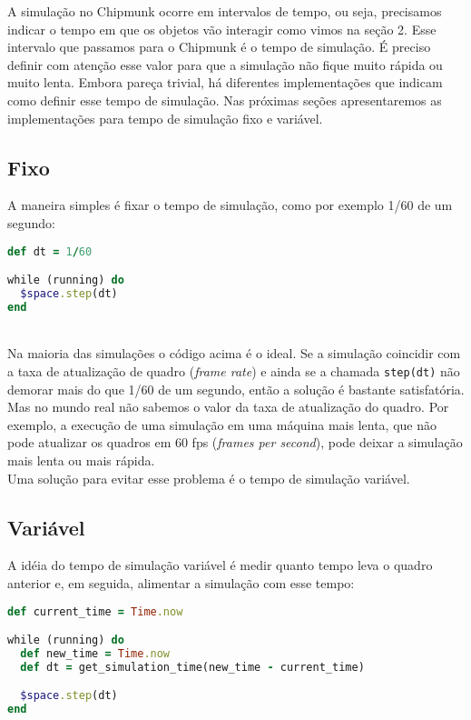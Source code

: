 A simulação no Chipmunk ocorre em intervalos de tempo, ou seja, precisamos indicar o tempo em que os objetos vão interagir como vimos na seção 2. 
Esse intervalo que passamos para o Chipmunk é o tempo de simulação. É preciso definir com atenção esse valor para que a simulação não fique muito rápida
ou muito lenta. Embora pareça trivial, há diferentes implementações que indicam como definir esse tempo de simulação. Nas 
próximas seções apresentaremos as implementações para tempo de simulação fixo e variável.

\subsection{Fixo}

A maneira simples é fixar o tempo de simulação, como por exemplo 1/60 de um segundo:

\begin{lstlisting}[language=Ruby, caption=Implementação de tempo de simulação fixo]
def dt = 1/60

while (running) do
  $space.step(dt)
end
\end{lstlisting}

\ \\
\hspace*{14pt} Na maioria das simulações o código acima é o ideal. Se a simulação coincidir com a taxa de atualização de quadro (\textit{frame rate}) e ainda se a chamada {\tt step(dt)} não demorar mais do que 1/60 de um segundo, então a solução é bastante satisfatória. Mas no mundo real não sabemos
o valor da taxa de atualização do quadro. Por exemplo, a execução de uma simulação em uma máquina mais lenta, que não pode atualizar os quadros em 60 fps (\textit{frames per second}),
pode deixar a simulação mais lenta ou mais rápida. \\

Uma solução para evitar esse problema é o tempo de simulação variável.

\subsection{Variável}

A idéia do tempo de simulação variável é medir quanto tempo leva o quadro anterior e, em seguida, alimentar a simulação com esse tempo: 

\newpage
\begin{lstlisting}[language=Ruby, caption=Implementação de tempo de simulação variável]
def current_time = Time.now

while (running) do
  def new_time = Time.now
  def dt = get_simulation_time(new_time - current_time)

  $space.step(dt)
end

\end{lstlisting}


